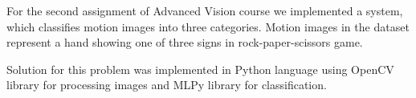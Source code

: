 For the second assignment of Advanced Vision course we implemented a system, which classifies motion images into three categories. Motion images in the dataset represent a hand showing one of three signs in rock-paper-scissors game. 

Solution for this problem was implemented in Python language using OpenCV library for processing images and MLPy library for classification.